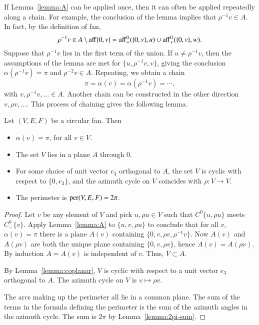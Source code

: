 If Lemma~\ref{lemma:A} can be applied once, then it can often be applied repeatedly along a chain.  For example, the conclusion of the lemma implies
that $\rho^{-1} v \in A$.  In fact, by the definition of fan, 
$$\rho^{-1}v \in A \setminus {\operatorname{aff}}\{0,v\} = {\operatorname{aff}}^0_+(\{0,v\},u) \cup {\operatorname{aff}}^0_+(\{0,v\},w).$$
Suppose that $\rho^{-1} v$ lies in the first term of the union.  If $u\ne \rho^{-1}v$, then the assumptions of the lemma
are met for $\{u,\rho^{-1} v,v\}$, giving the conclusion $\alpha(\rho^{-1} v)=\pi$ and $\rho^{-2}v\in A$.  Repeating, we obtain a chain
$$
\pi=\alpha(v) = \alpha(\rho^{-1} v) = \cdots,
$$
with $v,\rho^{-1}v,\ldots\in A$.  Another chain can be constructed in the other direction $v,\rho v,\ldots$.
This process of chaining gives the following lemma.

\begin{lemma}\label{lemma:circular}
Let $(V,E,F)$ be a circular fan. Then
\begin{itemize}
\item $\alpha(v)=\pi$, for all $v\in V$.
\item The set $V$ lies in a plane $A$ through $0$.
\item For some choice of unit vector $e_3$ orthogonal to $A$, the set $V$ is cyclic with respect to
$\{0,e_3\}$, and the azimuth cycle on $V$ coincides with $\rho:V\to V$.
\item The perimeter is ${\operatorname{per}}(V,E,F) =2\pi$.
\end{itemize}
\end{lemma}

\begin{proof}  Let $v$ be any element of  $V$ and pick $u,\rho u\in V$ such that $C^0\{u,\rho u\}$ meets $C^0_-\{v\}$.  Apply
Lemma~\ref{lemma:A} to $\{u,v,\rho u\}$ to conclude that for all $v$, $\alpha(v)=\pi$ there is a plane $A(v)$ containing
$\{0,v,\rho v,\rho^{-1} v\}$.   Now $A(v)$ and $A(\rho v)$ are both the unique plane containing $\{0,v,\rho v\}$, hence $A(v) = A(\rho v)$.  By induction $A=A(v)$ is independent of $v$.  Thus, $V\subset A$.


By Lemma~\ref{lemma:coplanar}, $V$ is cyclic with respect to a unit vector $e_3$ orthogonal to $A$.  The
azimuth cycle on $V$ is $v \mapsto \rho v$.
%

The arcs making up the perimeter all lie in a common plane.   The sum of the terms in the formula defining the perimeter is the sum of the azimuth angles in the azimuth cycle.  The sum is $2\pi$ by Lemma~\ref{lemma:2pi-sum}.
\end{proof}

